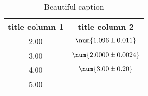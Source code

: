 \begin{table}
 \caption{Beautiful caption}
 \label{tab:important_label}
 \centering
{}
 \begin{tabular}{SS}
 \toprule 
    {title column 1}& {title column 2} \\
      & $\num{1.096\pm0.011}$ \\
           3.00 & $\num{2.0000\pm0.0024}$ \\
           4.00 & $\num{3.00\pm0.20}$ \\
           5.00 & $\text{\textbf{---}}$ \\
 \bottomrule
 \end{tabular}
\end{table}